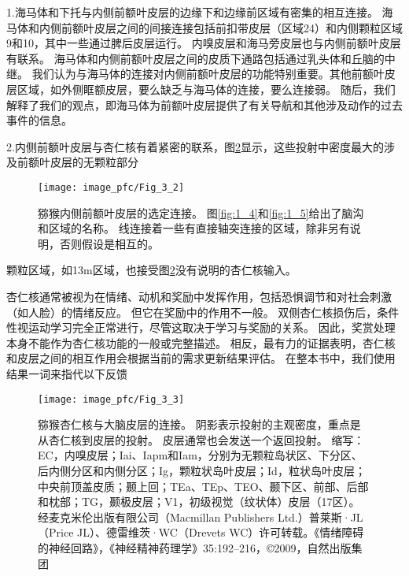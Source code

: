 1.海马体和下托与内侧前额叶皮层的边缘下和边缘前区域有密集的相互连接\cite{insausti2001cortical}。
海马体和内侧前额叶皮层之间的间接连接包括前扣带皮层（区域24）和内侧颗粒区域9和10，其中一些通过脾后皮层运行\cite{kobayashi2003macaque}。
内嗅皮层和海马旁皮层也与内侧前额叶皮层有联系\cite{kondo2003differential,munoz2005cortical}。
海马体和内侧前额叶皮层之间的皮质下通路包括通过乳头体和丘脑的中继。
我们认为与海马体的连接对内侧前额叶皮层的功能特别重要。其他前额叶皮层区域，如外侧眶额皮层，要么缺乏与海马体的连接，要么连接弱\cite{carmichael1995limbic}。
随后，我们解释了我们的观点，即海马体为前额叶皮层提供了有关导航和其他涉及动作的过去事件的信息。


2.内侧前额叶皮层与杏仁核有着紧密的联系，图\ref{fig:3_3}显示，这些投射中密度最大的涉及前额叶皮层的无颗粒部分\par


\begin{figure}[!htb]
	\centering
	\texttt{[image: image\_pfc/Fig\_3\_2]}
	\caption{猕猴内侧前额叶皮层的选定连接。
		图\ref{fig:1_4}和\ref{fig:1_5}给出了脑沟和区域的名称。
		线连接着一些有直接轴突连接的区域，除非另有说明，否则假设是相互的。}
	\label{fig:3_2}
\end{figure}


\cite{prather2001increased,morecraft2007amygdala}颗粒区域，如13m区域，也接受图\ref{fig:3_3}没有说明的杏仁核输入。\cite{saleem2008complementary}\par
杏仁核通常被视为在情绪、动机和奖励中发挥作用，包括恐惧调节和对社会刺激（如人脸）的情绪反应。
但它在奖励中的作用不一般。
双侧杏仁核损伤后，条件性视运动学习完全正常进行，尽管这取决于学习与奖励的关系\cite{murray1996role}。
因此，奖赏处理本身不能作为杏仁核功能的一般或完整描述。
相反，最有力的证据表明，杏仁核和皮层之间的相互作用会根据当前的需求更新结果评估\cite{baxter2002amygdala}。
在整本书中，我们使用结果一词来指代以下反馈\par


\begin{figure}[!htb]
	\centering
	\texttt{[image: image\_pfc/Fig\_3\_3]}
	\caption{猕猴杏仁核与大脑皮层的连接。
		阴影表示投射的主观密度，重点是从杏仁核到皮层的投射。
		皮层通常也会发送一个返回投射。
		缩写：EC，内嗅皮层；Iai、Iapm和Iam，分别为无颗粒岛状区、下分区、后内侧分区和内侧分区；Ig，颗粒状岛叶皮层；Id，粒状岛叶皮层；中央前顶盖皮质；颞上回；TEa、TEp、TEO、颞下区、前部、后部和枕部；TG，颞极皮层；V1，初级视觉（纹状体）皮层（17区）。
		经麦克米伦出版有限公司（Macmillan Publishers Ltd.）普莱斯·JL（Price JL）、德雷维茨·WC（Drevets WC）许可转载。《情绪障碍的神经回路》，《神经精神药理学》35:192–216，©2009，自然出版集团}
	\label{fig:3_3}
\end{figure}


